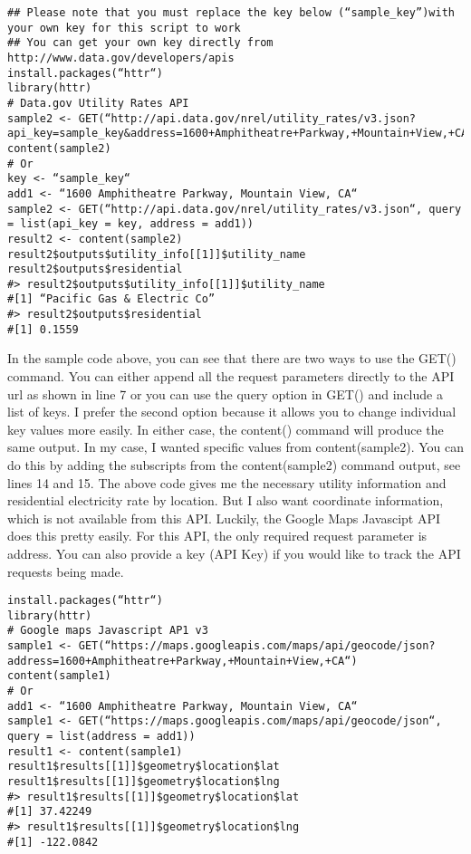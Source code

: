 \begin{framed}
\begin{verbatim}
## Please note that you must replace the key below (“sample_key”)with your own key for this script to work
## You can get your own key directly from http://www.data.gov/developers/apis
install.packages(“httr“)
library(httr)
# Data.gov Utility Rates API
sample2 <- GET(“http://api.data.gov/nrel/utility_rates/v3.json?api_key=sample_key&address=1600+Amphitheatre+Parkway,+Mountain+View,+CA“)
content(sample2)
# Or
key <- “sample_key“
add1 <- “1600 Amphitheatre Parkway, Mountain View, CA“
sample2 <- GET(“http://api.data.gov/nrel/utility_rates/v3.json“, query = list(api_key = key, address = add1))
result2 <- content(sample2)
result2$outputs$utility_info[[1]]$utility_name
result2$outputs$residential
#> result2$outputs$utility_info[[1]]$utility_name
#[1] “Pacific Gas & Electric Co”
#> result2$outputs$residential
#[1] 0.1559
\end{verbatim}
\end{framed}
In the sample code above, you can see that there are two ways to use the GET() command. You can either append all the request parameters directly to the API url as shown in line 7 or you can use the query option in GET() and include a list of keys. I prefer the second option because it allows you to change individual key values more easily. In either case, the content() command will produce the same output. In my case, I wanted specific values from content(sample2). You can do this by adding the subscripts from the content(sample2) command output, see lines 14 and 15.
The above code gives me the necessary utility information and residential electricity rate by location. But I also want coordinate information, which is not available from this API. Luckily, the Google Maps Javascipt API does this pretty easily. For this API, the only required request parameter is address. You can also provide a key (API Key) if you would like to track the API requests being made.
\begin{framed}
\begin{verbatim}
install.packages(“httr“)
library(httr)
# Google maps Javascript AP1 v3
sample1 <- GET(“https://maps.googleapis.com/maps/api/geocode/json?address=1600+Amphitheatre+Parkway,+Mountain+View,+CA“)
content(sample1)
# Or
add1 <- “1600 Amphitheatre Parkway, Mountain View, CA“
sample1 <- GET(“https://maps.googleapis.com/maps/api/geocode/json“, query = list(address = add1))
result1 <- content(sample1)
result1$results[[1]]$geometry$location$lat
result1$results[[1]]$geometry$location$lng
#> result1$results[[1]]$geometry$location$lat
#[1] 37.42249
#> result1$results[[1]]$geometry$location$lng
#[1] -122.0842
\end{verbatim}
\end{framed}
